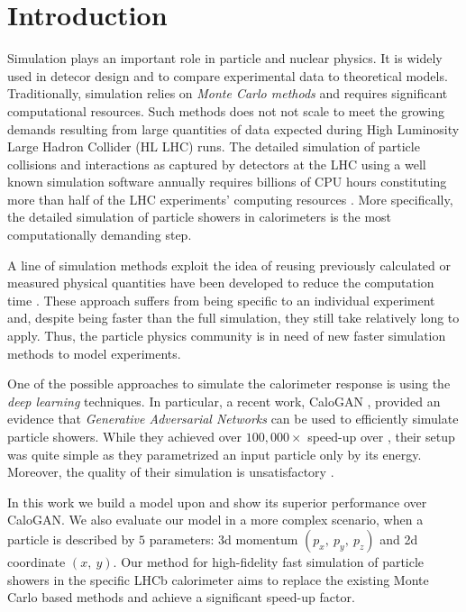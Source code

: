 \section{Introduction}

Simulation plays an important role in particle and nuclear physics. It is widely used in detecor design and to compare experimental data to theoretical models. Traditionally, simulation relies on \textit{Monte Carlo methods} and requires significant computational resources. Such methods does not not scale to meet the growing demands resulting from large quantities of data expected during High Luminosity Large Hadron Collider (HL LHC) runs. The detailed simulation of particle collisions and interactions as captured by detectors at the LHC using a well known simulation software \geant annually requires billions of CPU hours constituting more than half of the LHC experiments' computing resources \cite{bozzi2014, flynn2015computing}. More specifically, the detailed simulation of particle showers in calorimeters is the most computationally demanding step.
 
A line of simulation methods exploit the idea of reusing previously calculated or measured physical quantities have been developed to reduce the computation time \cite{grindhammer2000parameterized,atlas2010simulation}. These approach suffers from being specific to an individual experiment and, despite being faster than the full simulation, they still take relatively long to apply. Thus, the particle physics community is in need of new faster simulation methods to model experiments. 
    
One of the possible approaches to simulate the calorimeter response is using the \textit{deep learning} techniques. In particular, a recent work, CaloGAN \cite{paganini2017calogan}, provided an evidence that \textit{Generative Adversarial Networks} can be used to efficiently simulate particle showers. While they achieved over $100,000 \times$ speed-up over \geant, their setup was quite simple as they parametrized an input particle only by its energy. Moreover, the quality of their simulation is unsatisfactory . 

In this work we build a model upon  and show its superior performance over CaloGAN. We also evaluate our model in a more complex scenario, when a particle is described by $5$ parameters: 3d momentum $(p_x,~ p_y,~ p_z)$ and 2d coordinate $(x,~ y)$. Our method for high-fidelity fast simulation of particle showers in the specific LHCb calorimeter aims to replace the existing Monte Carlo based methods and achieve a significant speed-up factor.
 




